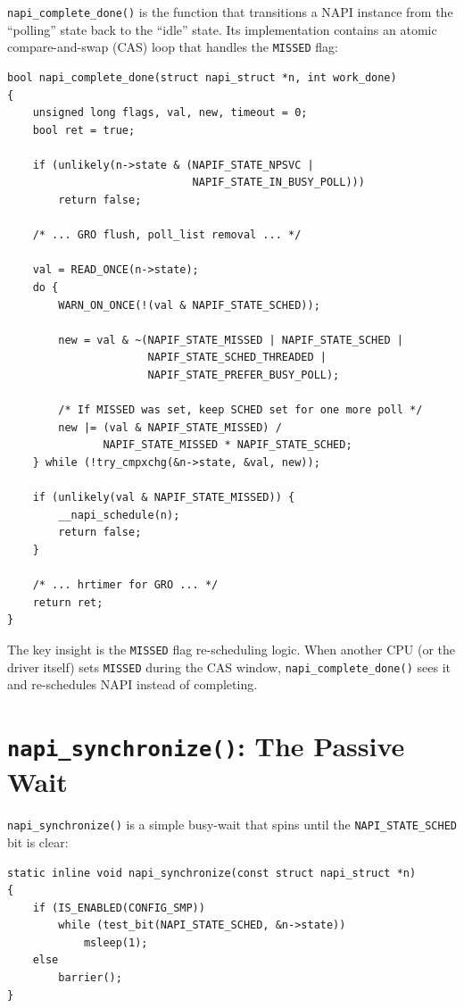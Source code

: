 \documentclass[11pt,a4paper,openany]{book}
\newcommand{\func}[1]{\texttt{#1()}}
\newcommand{\flag}[1]{\texttt{#1}}
\begin{document}
\func{napi\_complete\_done} is the function that transitions a NAPI
instance from the ``polling'' state back to the ``idle'' state.  Its
implementation contains an atomic compare-and-swap (CAS) loop that
handles the \flag{MISSED} flag:

\begin{lstlisting}[caption={\texttt{napi\_complete\_done()} core logic (net/core/dev.c)},
    label=lst:napi-complete-done]
bool napi_complete_done(struct napi_struct *n, int work_done)
{
    unsigned long flags, val, new, timeout = 0;
    bool ret = true;

    if (unlikely(n->state & (NAPIF_STATE_NPSVC |
                             NAPIF_STATE_IN_BUSY_POLL)))
        return false;

    /* ... GRO flush, poll_list removal ... */

    val = READ_ONCE(n->state);
    do {
        WARN_ON_ONCE(!(val & NAPIF_STATE_SCHED));

        new = val & ~(NAPIF_STATE_MISSED | NAPIF_STATE_SCHED |
                      NAPIF_STATE_SCHED_THREADED |
                      NAPIF_STATE_PREFER_BUSY_POLL);

        /* If MISSED was set, keep SCHED set for one more poll */
        new |= (val & NAPIF_STATE_MISSED) /
               NAPIF_STATE_MISSED * NAPIF_STATE_SCHED;
    } while (!try_cmpxchg(&n->state, &val, new));

    if (unlikely(val & NAPIF_STATE_MISSED)) {
        __napi_schedule(n);
        return false;
    }

    /* ... hrtimer for GRO ... */
    return ret;
}
\end{lstlisting}

The key insight is the \flag{MISSED} flag re-scheduling logic.  When
another CPU (or the driver itself) sets \flag{MISSED} during the CAS
window, \func{napi\_complete\_done} sees it and re-schedules NAPI
instead of completing.

\section{\texttt{napi\_synchronize()}: The Passive Wait}
\label{sec:napi-synchronize}

\func{napi\_synchronize} is a simple busy-wait that spins until the
\flag{NAPI\_STATE\_SCHED} bit is clear:

\begin{lstlisting}[caption={\texttt{napi\_synchronize()} (include/linux/netdevice.h)}]
static inline void napi_synchronize(const struct napi_struct *n)
{
    if (IS_ENABLED(CONFIG_SMP))
        while (test_bit(NAPI_STATE_SCHED, &n->state))
            msleep(1);
    else
        barrier();
}
\end{lstlisting}
\end{document}
